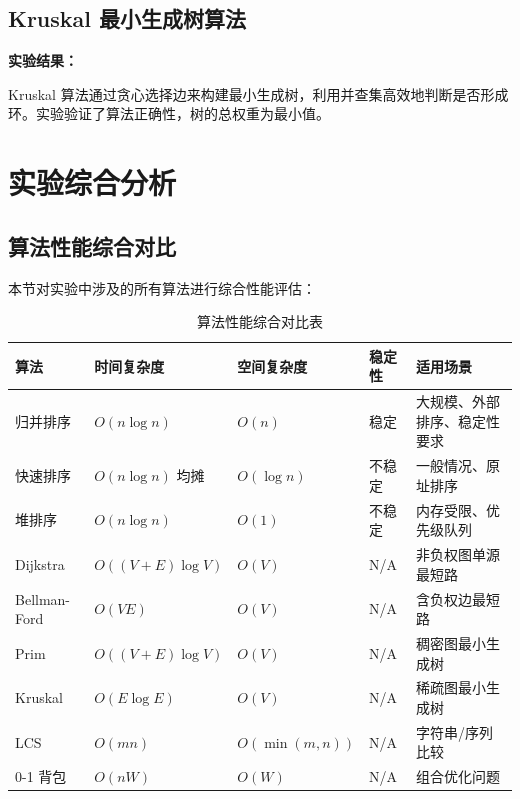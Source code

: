 \documentclass[12pt,a4paper,UTF8]{article}
\newenvironment{实验结果}{
    \par\noindent\textbf{实验结果：}\par
}{\par\vspace{1em}}
\begin{document}
\subsection{Kruskal 最小生成树算法}



\begin{实验结果}
    Kruskal 算法通过贪心选择边来构建最小生成树，利用并查集高效地判断是否形成环。实验验证了算法正确性，树的总权重为最小值。
\end{实验结果}

\section{实验综合分析}

\subsection{算法性能综合对比}

本节对实验中涉及的所有算法进行综合性能评估：

\begin{landscape}
\begin{table}[H]
    \centering
    \caption{算法性能综合对比表}
    \begin{tabular}{p{3cm}p{2.5cm}p{2.5cm}p{3cm}p{4cm}}
        \toprule
        \textbf{算法} & \textbf{时间复杂度} & \textbf{空间复杂度} & \textbf{稳定性} & \textbf{适用场景} \\
        \midrule
        归并排序 & $O(n\log n)$ & $O(n)$ & 稳定 & 大规模、外部排序、稳定性要求 \\
        快速排序 & $O(n\log n)$ 均摊 & $O(\log n)$ & 不稳定 & 一般情况、原址排序 \\
        堆排序 & $O(n\log n)$ & $O(1)$ & 不稳定 & 内存受限、优先级队列 \\
        Dijkstra & $O((V+E)\log V)$ & $O(V)$ & N/A & 非负权图单源最短路 \\
        Bellman-Ford & $O(VE)$ & $O(V)$ & N/A & 含负权边最短路 \\
        Prim & $O((V+E)\log V)$ & $O(V)$ & N/A & 稠密图最小生成树 \\
        Kruskal & $O(E\log E)$ & $O(V)$ & N/A & 稀疏图最小生成树 \\
        LCS & $O(mn)$ & $O(\min(m,n))$ & N/A & 字符串/序列比较 \\
        0-1 背包 & $O(nW)$ & $O(W)$ & N/A & 组合优化问题 \\
        \bottomrule
    \end{tabular}
\end{table}
\end{landscape}
\end{document}
